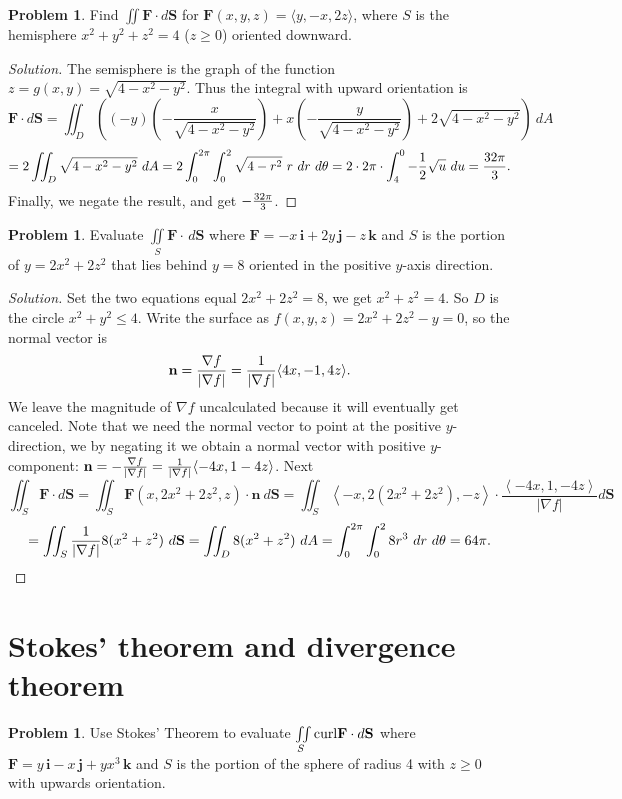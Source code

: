 \documentclass[12pt]{amsart}%
\theoremstyle{plain}
\theoremstyle{definition}
\newtheorem{prob}[theorem]{Problem}
\theoremstyle{special}
\newcommand{\sol}[1]{
{\begin{proof}[Solution]#1\end{proof}}
}
\newcommand{\Prob}[1]{\begin{tcolorbox}%
\begin{prob}
	#1
\end{prob}
\end{tcolorbox}	
}
\renewcommand{\vec}{\mathbf}
\begin{document}
\Prob{ Find $ \iint \vec F\cdot d \vec S$  for $\vec F(x,y,z)=\langle y,-x,2z\rangle$, where $S$ is the hemisphere $x^2+y^2+z^2=4$ ($z\geq 0$) oriented downward.}
\sol{The semisphere is the graph of the function $z=g(x,y)=\sqrt{4-x^2-y^2}$. Thus the integral with upward orientation is
\[\vec F\cdot d \vec S=\iint_D\left((-y)\left(-\frac{x}{\sqrt{4-x^2-y^2}}\right)+x\left(-\frac{y}{\sqrt{4-x^2-y^2}}\right)+2\sqrt{4-x^2-y^2}\right)\ dA\]
\[=2\iint_D\sqrt{4-x^2-y^2} \ dA=2\int_0^{2\pi} \int_0^{2}\sqrt{4-r^2}\ r\ dr\ d\theta=2\cdot 2\pi \cdot \int_4^0-{1\over 2}\sqrt{u}\ du={32\pi\over 3}.\]
Finally, we negate the result, and get $ -{32\pi\over 3}$.}
\Prob{ Evaluate \( \iint\limits_{S}{{\vec F\cdot \,d\vec S}}\) where \(\vec F =  - x\,\vec i + 2y\,\vec j - z\,\vec k\) and \(S\) is the portion of \(y = 2{x^2} + 2{z^2}\) that lies behind \(y = 8\) oriented in the positive \(y\)-axis direction.}
\sol{Set the two equations equal $2x^2+2z^2=8$, we get $x^2+z^2=4$. So $D$ is the circle $x^2+y^2\leq 4$. Write the surface as $f\left( {x,y,z} \right) = 2{x^2} + 2{z^2} - y = 0$, so the normal vector is
\[\vec n={\nabla f\over |\nabla f|}={1\over |\nabla f|}\langle 4x,-1,4z \rangle. \]
We leave the magnitude of $\nabla f$ uncalculated because it will eventually get canceled. Note that we need the normal vector to point at the positive $y$-direction, we by negating it we obtain a normal vector with positive $y$-component: \(\vec n=-{\nabla f\over |\nabla f|}={1\over |\nabla f|}\langle -4x,1-4z \rangle\).
Next
\[\iint_S \vec F\cdot d \vec S=\iint_S\vec F\left( {x,2{x^2} + 2{z^2},z} \right)\cdot \vec n\ d\vec S=\iint_S \left\langle { - x,2\left( {2{x^2} + 2{z^2}} \right), - z} \right\rangle \cdot \frac{{\left\langle { - 4x,1, - 4z} \right\rangle }}{{\left| {\nabla f} \right|}}  d \vec S\]
\[=\iint_S {1\over |\nabla f|}8(x^2+z^2)\ d \vec S=\iint_D8(x^2+z^2)\ dA=\int_0^{2\pi} \int_0^2 8r^3\ dr\ d\theta=64\pi.\qedhere \]}
\newpage
\section{Stokes' theorem and divergence theorem}
\Prob{Use Stokes' Theorem to evaluate \( \iint\limits_{S}{{{\mathop{\rm curl } \nolimits} \vec F\cdot d\vec S}}\) where \(\vec F = y\,\vec i - x\,\vec j + y{x^3}\,\vec k\) and \(S\) is the portion of the sphere of radius 4 with \(z \ge 0\) with upwards orientation.}
\end{document}

